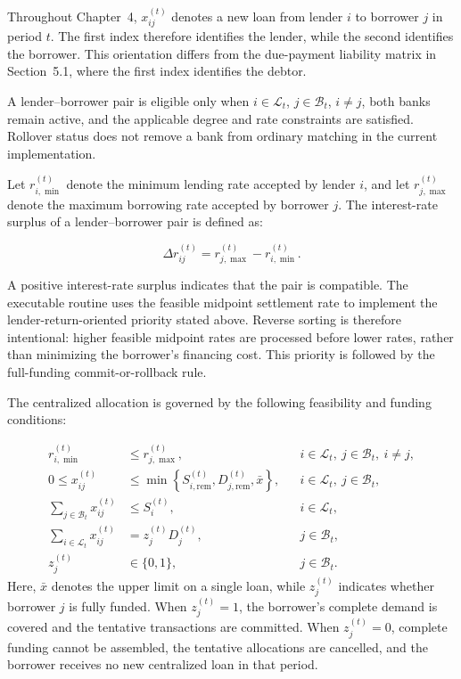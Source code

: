 Throughout Chapter~4, \(x_{ij}^{(t)}\) denotes a new loan from lender
\(i\) to borrower \(j\) in period \(t\). The first index therefore
identifies the lender, while the second identifies the borrower. This
orientation differs from the due-payment liability matrix in Section~5.1,
where the first index identifies the debtor.

A lender--borrower pair is eligible only when \(i \in \mathcal{L}_{t}\),
\(j \in \mathcal{B}_{t}\), \(i \neq j\), both banks remain active, and
the applicable degree and rate constraints are satisfied. Rollover
status does not remove a bank from ordinary matching in the current
implementation.

Let \(r_{i,\min}^{(t)}\) denote the minimum lending rate accepted by
lender \(i\), and let \(r_{j,\max}^{(t)}\) denote the maximum borrowing
rate accepted by borrower \(j\). The interest-rate surplus of a
lender--borrower pair is defined as:

\begin{equation}
\Delta r_{ij}^{(t)}=r_{j,\max}^{(t)}-r_{i,\min}^{(t)}\label{eq:rate-surplus}.
\end{equation}

A positive interest-rate surplus indicates that the pair is compatible.
The executable routine uses the feasible midpoint settlement rate to
implement the lender-return-oriented priority stated above. Reverse
sorting is therefore intentional: higher feasible midpoint rates are
processed before lower rates, rather than minimizing the borrower's
financing cost. This priority is followed by the full-funding
commit-or-rollback rule.

The centralized allocation is governed by the following feasibility and
funding conditions:

\begin{equation}
\begin{aligned}
r_{i,\min}^{(t)}&\leq r_{j,\max}^{(t)},&&i\in\mathcal L_t,\ j\in\mathcal B_t,\ i\neq j,\\
0\leq x_{ij}^{(t)}&\leq\min\left\{S_{i,\mathrm{rem}}^{(t)},D_{j,\mathrm{rem}}^{(t)},\bar x\right\},&&i\in\mathcal L_t,\ j\in\mathcal B_t,\\
\sum_{j\in\mathcal B_t}x_{ij}^{(t)}&\leq S_i^{(t)},&&i\in\mathcal L_t,\\
\sum_{i\in\mathcal L_t}x_{ij}^{(t)}&=z_j^{(t)}D_j^{(t)},&&j\in\mathcal B_t,\\
z_j^{(t)}&\in\{0,1\},&&j\in\mathcal B_t.
\end{aligned}\label{eq:centralized-conditions}
\end{equation}
\vspace{-0.4\baselineskip}
\noindent Here, \(\bar x\) denotes the upper limit on a single loan, while
\(z_{j}^{(t)}\) indicates whether borrower \(j\) is fully funded. When
\(z_{j}^{(t)} = 1\), the borrower's complete demand is covered and the
tentative transactions are committed. When \(z_{j}^{(t)} = 0\), complete
funding cannot be assembled, the tentative allocations are cancelled,
and the borrower receives no new centralized loan in that period.

